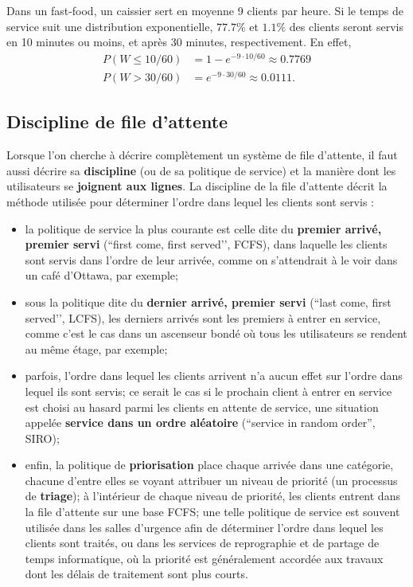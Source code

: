 \begin{Exemple}
 Dans un fast-food, un caissier sert en moyenne 9 clients par heure. Si le temps de service suit une distribution exponentielle, $77.7\%$ et $1.1\%$ des clients seront servis en 10 minutes ou moins, et après 30 minutes, respectivement. En effet, \begin{align*}P(W\leq 10/60)&=1-e^{-9 \cdot 10/60} \approx 0.7769\\ P(W>30/60)&=e^{-9\cdot 30/60}\approx 0.0111.\end{align*}
\end{Exemple}

\subsection{Discipline de file d'attente}
Lorsque l’on cherche à décrire complètement un système de file d'attente, il faut aussi décrire sa \textbf{discipline} (ou de sa politique de service) et la manière dont les utilisateurs se  \textbf{joignent aux lignes}. La discipline de la file d'attente décrit la méthode utilisée pour déterminer l'ordre dans lequel les clients sont servis : 
\begin{itemize}
\item la politique de service la plus courante est celle dite du \textbf{premier arrivé, premier servi} (``first come, first served’’, FCFS), dans laquelle les clients sont servis dans l'ordre de leur arrivée, comme on s'attendrait à le voir dans un café d’Ottawa, par exemple;
\item sous la politique dite du \textbf{dernier arrivé, premier servi} (``last come, first served’’, LCFS), les derniers arrivés sont les premiers à entrer en service, comme c’est le cas dans un ascenseur bondé où tous les utilisateurs se rendent au même étage, par exemple;
\item parfois, l'ordre dans lequel les clients arrivent n'a aucun effet sur l'ordre dans lequel ils sont servis; ce serait le cas si le prochain client à entrer en service est choisi au hasard parmi les clients en attente de service, une situation appelée \textbf{service dans un ordre aléatoire} (``service in random order'', SIRO); 
\item enfin, la politique de \textbf{priorisation} place chaque arrivée dans une catégorie, chacune d'entre elles se voyant attribuer un niveau de priorité (un processus de \textbf{triage}); à l'intérieur de chaque niveau de priorité, les clients entrent dans la file d'attente sur une base FCFS; une telle politique de service est souvent utilisée dans les salles d'urgence afin de déterminer l'ordre dans lequel les clients sont traités, ou dans les services de reprographie et de partage de temps informatique, où la priorité est généralement accordée aux travaux dont les délais de traitement sont plus courts.
\end{itemize}

